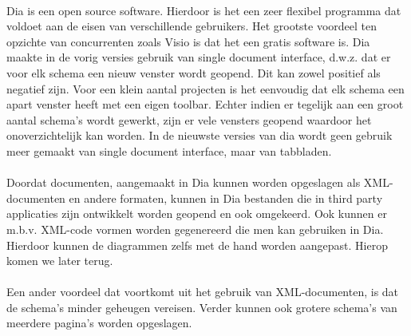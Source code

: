 \documentclass[12pt,a4paper]{report}
\begin{document}
\begin{flushleft}
\paragraph*{}
Dia is een open source software. Hierdoor is het een zeer flexibel programma dat voldoet aan de eisen van verschillende gebruikers. Het grootste voordeel ten opzichte van concurrenten zoals Visio is dat het een gratis software is. Dia maakte in de vorig versies gebruik van single document interface, d.w.z. dat er voor elk schema een nieuw venster wordt geopend. Dit kan zowel positief als negatief zijn. Voor een klein aantal projecten is het eenvoudig dat elk schema een apart venster heeft met een eigen toolbar. Echter indien er tegelijk aan een groot aantal schema's wordt gewerkt, zijn er vele vensters geopend waardoor het onoverzichtelijk kan worden. In de nieuwste versies van dia wordt geen gebruik meer gemaakt van single document interface, maar van tabbladen.
\paragraph*{}
Doordat documenten, aangemaakt in Dia kunnen worden opgeslagen als XML-documenten en andere formaten, kunnen in Dia bestanden die in third party applicaties zijn ontwikkelt worden geopend en ook omgekeerd. Ook kunnen er m.b.v. XML-code vormen worden gegenereerd die men kan gebruiken in Dia. Hierdoor kunnen de diagrammen zelfs met de hand worden aangepast. Hierop komen we later terug.
\paragraph*{}
Een ander voordeel dat voortkomt uit het gebruik van XML-documenten, is dat de schema's minder geheugen vereisen. Verder kunnen ook grotere schema's van meerdere pagina's worden opgeslagen.

\end{flushleft}
\end{document}
